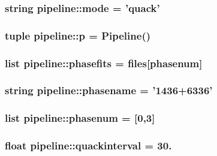 \hypertarget{namespacepipeline_ab3aedaf24061f05c06f13e3974bb528f}{
\subsubsection[{mode}]{\setlength{\rightskip}{0pt plus 5cm}string {\bf pipeline\-::mode} = 'quack'}}\label{namespacepipeline_ab3aedaf24061f05c06f13e3974bb528f}
\hypertarget{namespacepipeline_af5fe35ff38e8f9792769a9dec62ec7f2}{
\subsubsection[{p}]{\setlength{\rightskip}{0pt plus 5cm}tuple {\bf pipeline\-::p} = {\bf \-Pipeline}()}}\label{namespacepipeline_af5fe35ff38e8f9792769a9dec62ec7f2}
\hypertarget{namespacepipeline_ae6d6bf5c8ff903dca0d8e8c8c0aa83fb}{
\subsubsection[{phasefits}]{\setlength{\rightskip}{0pt plus 5cm}list {\bf pipeline\-::phasefits} = {\bf files}\mbox{[}{\bf phasenum}\mbox{]}}}\label{namespacepipeline_ae6d6bf5c8ff903dca0d8e8c8c0aa83fb}
\hypertarget{namespacepipeline_a3889949f24f7ee0ddf076131f3ba6faa}{
\subsubsection[{phasename}]{\setlength{\rightskip}{0pt plus 5cm}string {\bf pipeline\-::phasename} = '1436+6336'}}\label{namespacepipeline_a3889949f24f7ee0ddf076131f3ba6faa}
\hypertarget{namespacepipeline_ac1c3efa973c83639249a0124f5d0b1be}{
\subsubsection[{phasenum}]{\setlength{\rightskip}{0pt plus 5cm}list {\bf pipeline\-::phasenum} = \mbox{[}0,3\mbox{]}}}\label{namespacepipeline_ac1c3efa973c83639249a0124f5d0b1be}
\hypertarget{namespacepipeline_a79d2ebe895f856da9610081a56d7d7b8}{
\subsubsection[{quackinterval}]{\setlength{\rightskip}{0pt plus 5cm}float {\bf pipeline\-::quackinterval} = 30.}}\label{namespacepipeline_a79d2ebe895f856da9610081a56d7d7b8}
